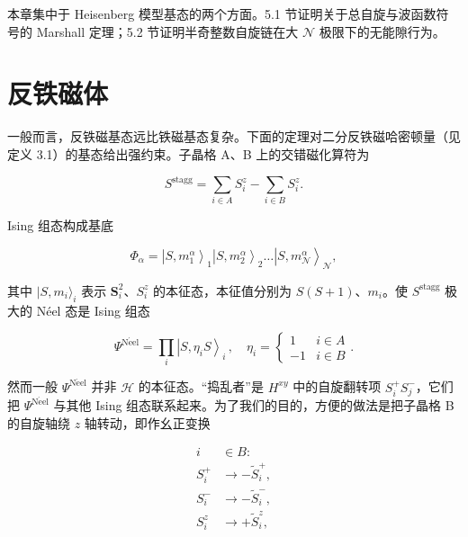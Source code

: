 本章集中于 Heisenberg 模型基态的两个方面。5.1 节证明关于总自旋与波函数符号的 Marshall 定理；5.2 节证明半奇整数自旋链在大 $\mathcal{N}$ 极限下的无能隙行为。

\section{反铁磁体}

一般而言，反铁磁基态远比铁磁基态复杂。下面的定理对二分反铁磁哈密顿量（见定义 3.1）的基态给出强约束。子晶格 A、B 上的交错磁化算符为

\begin{equation*}
S ^ {\mathrm{stagg}} = \sum_ {i \in A} S _ {i} ^ {z} - \sum_ {i \in B} S _ {i} ^ {z}.
\tag{5.5}
\end{equation*}

Ising 组态构成基底

\begin{equation*}
\Phi_ {\alpha} = \left| S, m _ {1} ^ {\alpha} \right\rangle_ {1} \left| S, m _ {2} ^ {\alpha} \right\rangle_ {2} \dots \left| S, m _ {\mathcal {N}} ^ {\alpha} \right\rangle_ {\mathcal {N}} ,
\tag{5.6}
\end{equation*}

其中 $|S, m_i \rangle_i$ 表示 $\mathbf{S}_i^2$、$S_i^z$ 的本征态，本征值分别为 $S(S + 1)$、$m_i$。使 $S^{\mathrm{stagg}}$ 极大的 Néel 态是 Ising 组态

\begin{equation*}
\Psi^ {\mathrm{N\acute{e}el}} = \prod_ {i} \left| S, \eta_ {i} S \right\rangle_ {i} \, , \quad \eta_ {i} = \left\{ \begin{array}{ll} 1 & i \in A \\ - 1 & i \in B \end{array} \right. .
\tag{5.7}
\end{equation*}

然而一般 $\Psi^{\mathrm{N\acute{e}el}}$ 并非 $\mathcal{H}$ 的本征态。“捣乱者”是 $H^{xy}$ 中的自旋翻转项 $S_{i}^{+}S_{j}^{-}$，它们把 $\Psi^{\mathrm{N\acute{e}el}}$ 与其他 Ising 组态联系起来。为了我们的目的，方便的做法是把子晶格 B 的自旋轴绕 $z$ 轴转动，即作幺正变换

\begin{align*}
i & \in B :\\
S _ {i} ^ {+} & \rightarrow - \tilde {S} _ {i} ^ {+} ,\\
S _ {i} ^ {-} & \rightarrow - \tilde {S} _ {i} ^ {-} ,\\
S _ {i} ^ {z} & \rightarrow + \tilde {S} _ {i} ^ {z} ,
\tag{5.8}
\end{align*}

